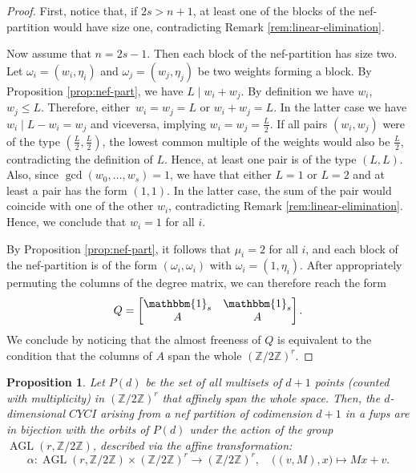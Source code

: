 \documentclass{amsart}
\newcommand{\Z}{\mathbb{Z}}
\newtheorem{proposition}[lem]{Proposition}
\theoremstyle{definition}
\begin{document}
\begin{proof}
    First, notice that, if $2s>n+1$, at least one of the blocks of the nef-partition would have size one, contradicting Remark \ref{rem:linear-elimination}.
    
    Now assume that $n=2s-1$. Then each block of the nef-partition has size two.
    Let $\omega_i=(w_i,\eta_i)$ and $\omega_j=(w_j,\eta_j)$ be two weights forming a block.
    By Proposition \ref{prop:nef-part}, we have $L \mid w_i + w_j$.
    By definition we have $w_i$, $w_j \le L$. Therefore, either~$w_i = w_j = L$ or $w_i+w_j=L$. In the latter case we have $w_i \mid L-w_i=w_j$ and viceversa, implying $w_i=w_j=\frac{L}{2}$.
    If all pairs $(w_i,w_j)$ were of the type $\left(\frac{L}{2},\frac{L}{2}\right)$, the lowest common multiple of the weights would also be $\frac{L}{2}$, contradicting the definition of $L$. Hence, at least one pair is of the type $(L,L)$. Also, since $\gcd(w_0,\dots,w_s)=1$, we have that either $L=1$ or $L=2$ and at least a pair has the form $(1,1)$. In the latter case, the sum of the pair would coincide with one of the other $w_i$, contradicting Remark \ref{rem:linear-elimination}. Hence, we conclude that $w_i=1$ for all $i$.

    By Proposition \ref{prop:nef-part}, it follows that $\mu_i=2$ for all $i$, and each block of the nef-partition is of the form $(\omega_i,\omega_i)$ with $\omega_i=(1,\eta_i)$. After appropriately permuting the columns of the degree matrix, we can therefore reach the form
    $$
    Q = \begin{bmatrix}
    \mathbbm{1}_{s} & \mathbbm{1}_s \\
    A & A
    \end{bmatrix}.
    $$
    We conclude by noticing that the almost freeness of $Q$ is equivalent to the condition that the columns of $A$ span the whole $(\Z/2\Z)^r$.
\end{proof}

\begin{proposition}\label{prop:multisets}
    Let $P(d)$ be the set of all multisets of $d+1$ points (counted with multiplicity) in $(\Z/2\Z)^r$ that affinely span the whole space.
    Then, the $d$-dimensional $CYCI$ arising from a nef partition of codimension $d+1$ in a fwps are in bijection with the orbits of $P(d)$ under the action of the group $\operatorname{AGL}(r, \Z/2\Z)$, described via the affine transformation:
    \[
    \alpha: \operatorname{AGL}(r, \Z/2\Z) \times (\Z/2\Z)^r \to (\Z/2\Z)^r, \quad \big((v, M), x\big) \mapsto Mx + v.
    \]
\end{proposition}
\end{document}
